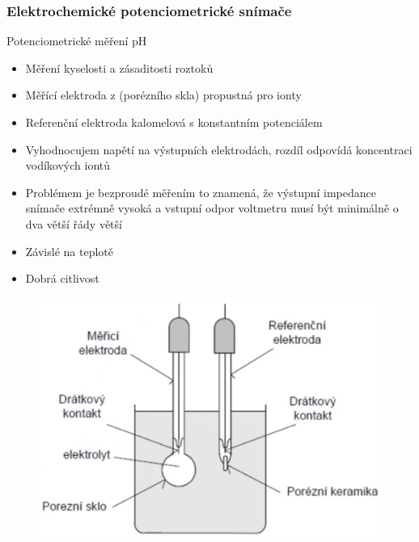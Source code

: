 \subsubsection*{Elektrochemické potenciometrické snímače}
Potenciometrické měření pH
\begin{itemize}
    \item Měření kyselosti a zásaditosti roztoků
    \item Měřící elektroda z (porézního skla) propustná pro ionty
    \item Referenční elektroda kalomelová s konstantním potenciálem
    \item Vyhodnocujem napětí na výstupních elektrodách, rozdíl odpovídá koncentraci vodíkových iontů
    \item Problémem je bezproudé měřením to znamená, že výstupní impedance snímače extrémně vysoká a vstupní odpor voltmetru musí být minimálně o dva větší řády větší
    \item Závislé na teplotě
    \item Dobrá citlivost
\end{itemize}
\begin{figure}[h!]
    \centering
    \includegraphics[scale = 0.1]{img/PotencPH.png}
\end{figure}

